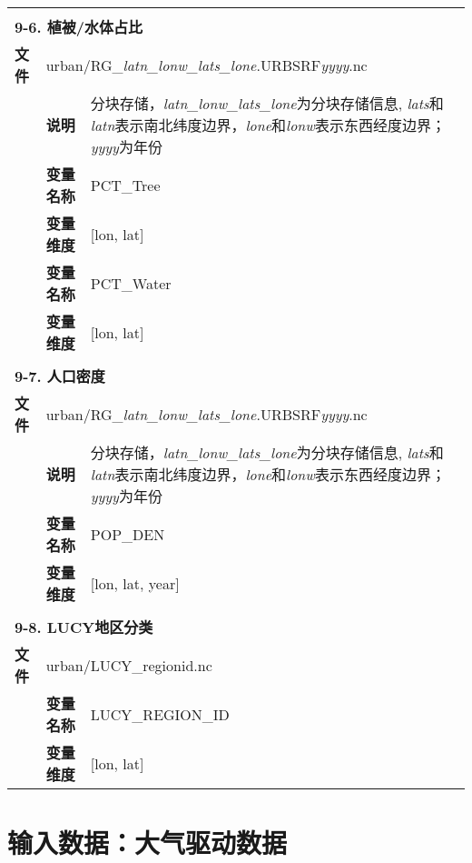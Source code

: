 {\begin{longtable}{llp{}}
\midrule
\vspace{2\baselineskip}\\
\multicolumn{3}{l}{\textbf{9-6. 植被/水体占比}} \\
\cline{1-3}
\textbf{文件} & \multicolumn{2}{l}{urban/RG\_\textit{latn\_lonw\_lats\_lone}.URBSRF\textit{yyyy}.nc} \\
& \textbf{说明} & 分块存储，\textit{latn\_lonw\_lats\_lone}为分块存储信息, \textit{lats}和\textit{latn}表示南北纬度边界，\textit{lone}和\textit{lonw}表示东西经度边界；\textit{yyyy}为年份 \\
\cline{2-3}
& \textbf{变量名称} & PCT\_Tree \\
& \textbf{变量维度} & {[}lon, lat{]} \\
\cline{2-3}
& \textbf{变量名称} & PCT\_Water \\
& \textbf{变量维度} & {[}lon, lat{]} \\

\midrule
\vspace{2\baselineskip}\\
\multicolumn{3}{l}{\textbf{9-7. 人口密度}} \\
\cline{1-3}
\textbf{文件} & \multicolumn{2}{l}{urban/RG\_\textit{latn\_lonw\_lats\_lone}.URBSRF\textit{yyyy}.nc} \\
& \textbf{说明} & 分块存储，\textit{latn\_lonw\_lats\_lone}为分块存储信息, \textit{lats}和\textit{latn}表示南北纬度边界，\textit{lone}和\textit{lonw}表示东西经度边界；\textit{yyyy}为年份 \\
\cline{2-3}
& \textbf{变量名称} & POP\_DEN \\
& \textbf{变量维度} & {[}lon, lat, year{]} \\

\midrule
\vspace{2\baselineskip}\\
\multicolumn{3}{l}{\textbf{9-8. LUCY地区分类}} \\
\cline{1-3}
\textbf{文件} & \multicolumn{2}{l}{urban/LUCY\_regionid.nc} \\
\cline{2-3}
& \textbf{变量名称} & LUCY\_REGION\_ID \\
& \textbf{变量维度} & {[}lon, lat{]} \\

\end{longtable}}

\section{输入数据：大气驱动数据}

